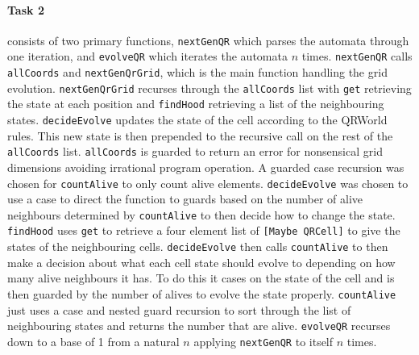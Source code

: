 \documentclass[11pt]{article}
\begin{document}
\paragraph{Task 2} consists of two primary functions, \verb|nextGenQR| which parses the automata through one iteration, and \verb|evolveQR| which iterates the automata $n$ times. \verb|nextGenQR| calls  \verb|allCoords| and \verb|nextGenQrGrid|, which is the main function handling the grid evolution. \verb|nextGenQrGrid| recurses through the \verb|allCoords| list with \verb|get| retrieving the state at each position and \verb|findHood| retrieving a list of the neighbouring states. \verb|decideEvolve| updates the state of the cell according to the QRWorld rules. This new state is then prepended to the recursive call on the rest of the \verb|allCoords| list. \verb|allCoords| is guarded to return an error for nonsensical grid dimensions avoiding irrational program operation. A guarded case recursion was chosen for \verb|countAlive| to only count alive elements. \verb|decideEvolve| was chosen to use a case to direct the function to guards based on the number of alive neighbours determined by \verb|countAlive| to then decide how to change  the state. \verb|findHood| uses \verb|get| to retrieve a four element list of \verb|[Maybe QRCell]| to give the states of the neighbouring cells. \verb|decideEvolve| then calls \verb|countAlive| to then make a decision about what each cell state should evolve to depending on how many alive neighbours it has. To do this it cases on the state of the cell and is then guarded by the number of alives to evolve the state properly. \verb|countAlive| just uses a case and nested guard recursion to sort through the list of neighbouring states and returns the number that are alive. \verb|evolveQR| recurses down to a base of 1 from a natural $n$ applying \verb|nextGenQR| to itself $n$ times.

\newpage
\end{document}
